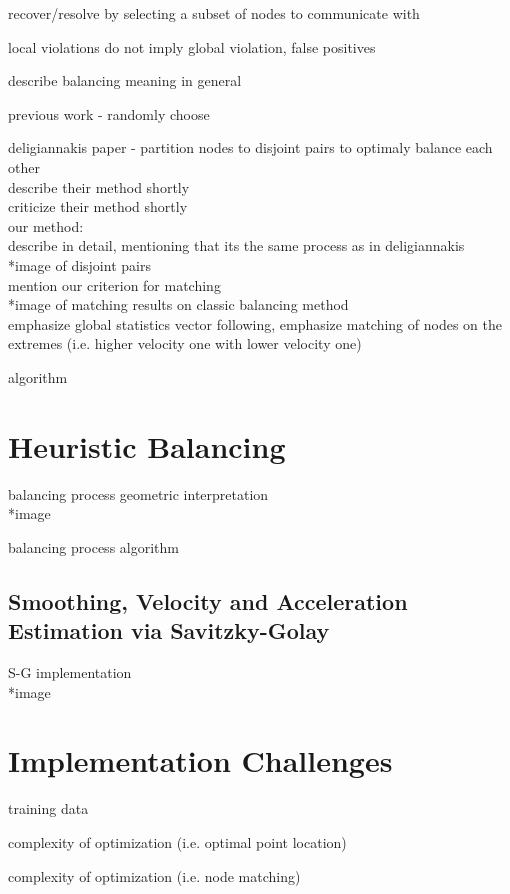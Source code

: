 recover/resolve by selecting a subset of nodes to communicate with

local violations do not imply global violation, false positives

describe balancing meaning in general

previous work - randomly choose

deligiannakis paper - partition nodes to disjoint pairs to optimaly balance each other\\
describe their method shortly\\
criticize their method shortly\\

our method:\\
describe in detail, mentioning that its the same process as in deligiannakis\\
*image of disjoint pairs\\
mention our criterion for matching\\
*image of matching results on classic balancing method\\
emphasize global statistics vector following, emphasize matching of nodes on the extremes (i.e. higher velocity one with lower velocity one)

algorithm\\

\section{Heuristic Balancing} \label{sec:impl-heuristic}

balancing process geometric interpretation\\
*image

balancing process algorithm

\subsection{Smoothing, Velocity and Acceleration Estimation via Savitzky-Golay} \label{subsec:impl-heuristic-vel}

S-G implementation\\
*image

\section{Implementation Challenges} \label{sec:impl-implChallenges}

training data

complexity of optimization (i.e. optimal point location)

complexity of optimization (i.e. node matching)
